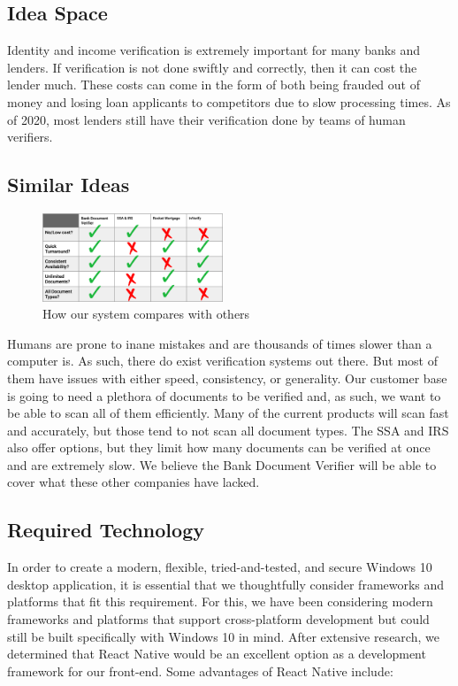 \doublespacing

\subsection{Idea Space}

Identity and income verification is extremely important for many banks and lenders. If verification is not done swiftly and correctly, then it can cost the lender much. These costs can come in the form of both being frauded out of money and losing loan applicants to competitors due to slow processing times. As of 2020, most lenders still have their verification done by teams of human verifiers.

\subsection{Similar Ideas}

\begin{figure}
    \centering
    \includegraphics[width=0.48\textwidth]{assets/comparison-table.png}
    \caption{How our system compares with others}
\end{figure}

Humans are prone to inane mistakes and are thousands of times slower than a computer is. As such, there do exist verification systems out there. But most of them have issues with either speed, consistency, or generality. Our customer base is going to need a plethora of documents to be verified and, as such, we want to be able to scan all of them efficiently. Many of the current products will scan fast and accurately, but those tend to not scan all document types. The SSA and IRS also offer options, but they limit how many documents can be verified at once and are extremely slow. We believe the Bank Document Verifier will be able to cover what these other companies have lacked.

\subsection{Required Technology}

In order to create a modern, flexible, tried-and-tested, and secure Windows 10 desktop application, it is essential that we thoughtfully consider frameworks and platforms that fit this requirement. For this, we have been considering modern frameworks and platforms that support cross-platform development but could still be built specifically with Windows 10 in mind. After extensive research, we determined that React Native would be an excellent option as a development framework for our front-end. Some advantages of React Native include: 


